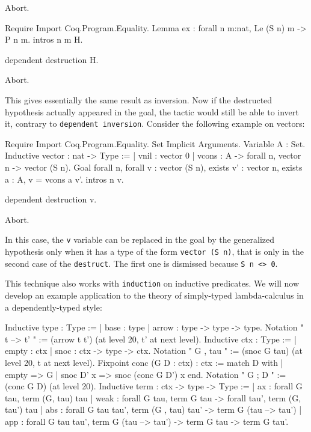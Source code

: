 \begin{coq_example*}
\begin{coq_eval}
Abort.
\end{coq_eval}
\begin{coq_example*}
Require Import Coq.Program.Equality.
Lemma ex : forall n m:nat, Le (S n) m -> P n m.
intros n m H.
\end{coq_example*}
\begin{coq_example}
dependent destruction H.
\end{coq_example}
\begin{coq_eval}
Abort.
\end{coq_eval}

This gives essentially the same result as inversion. Now if the
destructed hypothesis actually appeared in the goal, the tactic would
still be able to invert it, contrary to {\tt dependent
 inversion}. Consider the following example on vectors:

\begin{coq_example*}
Require Import Coq.Program.Equality.
Set Implicit Arguments.
Variable A : Set.
Inductive vector : nat -> Type := 
| vnil : vector 0 
| vcons : A -> forall n, vector n -> vector (S n).
Goal forall n, forall v : vector (S n), 
  exists v' : vector n, exists a : A, v = vcons a v'.
  intros n v.
\end{coq_example*}
\begin{coq_example}
  dependent destruction v.
\end{coq_example}
\begin{coq_eval}
Abort.
\end{coq_eval}

In this case, the {\tt v} variable can be replaced in the goal by the
generalized hypothesis only when it has a type of the form {\tt vector
 (S n)}, that is only in the second case of the {\tt destruct}. The
first one is dismissed because {\tt S n <> 0}.

This technique also works with {\tt induction} on inductive
predicates. We will now develop an example application to the
theory of simply-typed lambda-calculus in a dependently-typed style:

\begin{coq_example*}
Inductive type : Type :=
| base : type
| arrow : type -> type -> type.
Notation " t --> t' " := (arrow t t') (at level 20, t' at next level).
Inductive ctx : Type :=
| empty : ctx
| snoc : ctx -> type -> ctx.
Notation " G , tau " := (snoc G tau) (at level 20, t at next level).
Fixpoint conc (G D : ctx) : ctx :=
  match D with
    | empty => G
    | snoc D' x => snoc (conc G D') x
  end.
Notation " G ; D " := (conc G D) (at level 20).
Inductive term : ctx -> type -> Type :=
| ax : forall G tau, term (G, tau) tau
| weak : forall G tau, 
  term G tau -> forall tau', term (G, tau') tau
| abs : forall G tau tau', 
  term (G , tau) tau' -> term G (tau --> tau')
| app : forall G tau tau', 
  term G (tau --> tau') -> term G tau -> term G tau'.
\end{coq_example*}


\end{coq_example*}
